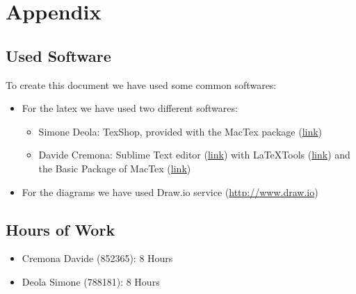 \documentclass[../../testPlan.tex]{subfiles}
\begin{document}
	\chapter{Appendix}
	
		\section{Used Software}
		To create this document we have used some common softwares:
		\begin{itemize}
			\item For the latex we have used two different softwares:
			\begin{itemize}
			
				\item Simone Deola: TexShop, provided with the MacTex package (\href{https://tug.org/mactex/}{link})
			
				\item Davide Cremona: Sublime Text editor (\href{http://www.sublimetext.com}{link}) with LaTeXTools (\href{https://github.com/SublimeText/LaTeXTools}{link}) and the Basic Package of MacTex (\href{https://tug.org/mactex/}{link})

			\end{itemize}

			\item For the diagrams we have used Draw.io service (\url{http://www.draw.io})
		\end{itemize}
		
		\section{Hours of Work}
		\begin{itemize}
			\item Cremona Davide (852365): 8 Hours
			\item Deola Simone (788181): 8 Hours
		\end{itemize}
\end{document}
